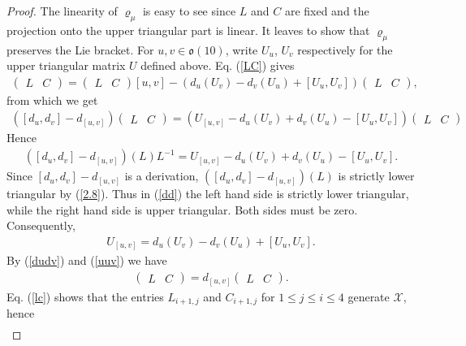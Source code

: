 \documentclass[12pt]{article}
\numberwithin{equation}{section}
\theoremstyle{definition}
\theoremstyle{remark}
\begin{document}
\begin{proof}
	The linearity of $\varrho_{\mu}$ is easy to see since $L$ and $C$ are fixed and the projection onto the upper triangular part is linear.
	It leaves to show that $\varrho_{\mu}$ preserves the Lie bracket. For $u,v\in\mathfrak{o}(10)$, write $U_u$, $U_v$ respectively for the upper triangular matrix $U$ defined above. Eq. (\ref{LC}) gives
	\begin{eqnarray}
		[d_u,d_v]\begin{pmatrix}
			L&C
		\end{pmatrix}=\begin{pmatrix}
		L&C
		\end{pmatrix}[u,v]-(d_u(U_v)-d_v(U_u)+[U_u,U_v])\begin{pmatrix}
		L&C
		\end{pmatrix}, \label{dudv}
	\end{eqnarray}
	from which we get
	\begin{eqnarray}
		([d_u,d_v]-d_{[u,v]})\begin{pmatrix}
			L&C
		\end{pmatrix}=(U_{[u,v]}-d_u(U_v)+d_v(U_u)-[U_u,U_v])\begin{pmatrix}
		L&C
		\end{pmatrix}
	\end{eqnarray}
	Hence
	\begin{eqnarray}
		([d_u,d_v]-d_{[u,v]})(L)L^{-1}=U_{[u,v]}-d_u(U_v)+d_v(U_u)-[U_u,U_v]. \label{dd}
	\end{eqnarray}
	Since $[d_u,d_v]-d_{[u,v]}$ is a derivation, $([d_u,d_v]-d_{[u,v]})(L)$ is strictly lower triangular by (\ref{2.8}). Thus in (\ref{dd}) the left hand side is strictly lower triangular, while the right hand side is upper triangular. Both sides must be zero. Consequently,
	\begin{eqnarray}
		U_{[u,v]}=d_u(U_v)-d_v(U_u)+[U_u,U_v]. \label{uuv}
	\end{eqnarray}
	By (\ref{dudv}) and (\ref{uuv}) we have
	\begin{eqnarray}
		[d_u,d_v]\begin{pmatrix}
			L&C
		\end{pmatrix}=d_{[u,v]}\begin{pmatrix}
		L&C
		\end{pmatrix}.
	\end{eqnarray}
	Eq. (\ref{lc}) shows that the entries $L_{i+1,j}$ and $C_{i+1,j}$ for $1\leqslant j\leqslant i\leqslant 4$ generate $\mathscr{X}$, hence
	\begin{eqnarray}

\end{eqnarray}
\end{proof}
\end{document}
